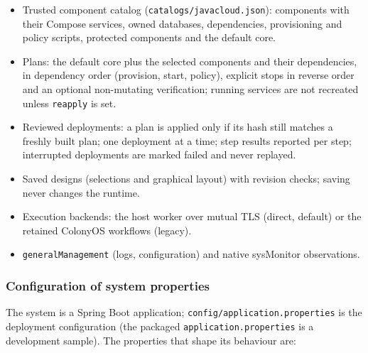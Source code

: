 \documentclass[a4paper]{arrowhead}
\begin{document}
\begin{itemize}
  \item Trusted component catalog (\texttt{catalogs/\allowbreak{}javacloud.\allowbreak{}json}): components with their Compose services, owned databases, dependencies, provisioning and policy scripts, protected components and the default core.
  \item Plans: the default core plus the selected components and their dependencies, in dependency order (provision, start, policy), explicit stops in reverse order and an optional non-mutating verification; running services are not recreated unless \texttt{reapply} is set.
  \item Reviewed deployments: a plan is applied only if its hash still matches a freshly built plan; one deployment at a time; step results reported per step; interrupted deployments are marked failed and never replayed.
  \item Saved designs (selections and graphical layout) with revision checks; saving never changes the runtime.
  \item Execution backends: the host worker over mutual TLS (direct, default) or the retained ColonyOS workflows (legacy).
  \item \texttt{general\allowbreak{}Management} (logs, configuration) and native sysMonitor observations.
\end{itemize}

\subsubsection{Configuration of system properties}

The system is a Spring Boot application; \texttt{config/\allowbreak{}application.\allowbreak{}properties} is the deployment configuration (the packaged \texttt{application.\allowbreak{}properties} is a development sample). The properties that shape its behaviour are:
\end{document}
